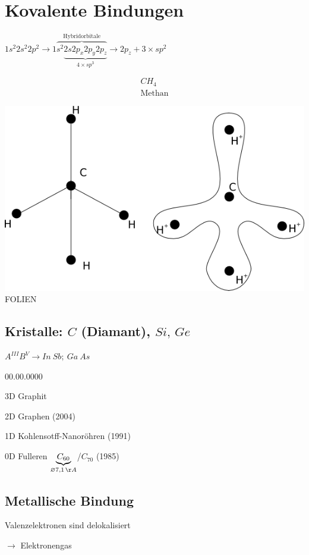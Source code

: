 \nr
\section{Kovalente Bindungen}

$1s^{2}2s^{2}2p^{2}\to1\overbrace{s^{2}\underbrace{2s2p_{x}2p_{y}2p_{z}}_{4\times sp^{3}}}^{\text{Hybridorbitale}}\to2p_{z}+3\times sp^{2}$

\begin{eqnarray*}
CH_{4}\\
\text{Methan}\end{eqnarray*}

\includegraphics[scale=.5]{images/2009-10-27-hybridspiegelung.png}
FOLIEN
\subsection{Kristalle: $C$ (Diamant), $Si,\, Ge$}

$A^{III}B^{V}\to In\ Sb;\ Ga\ As$
\begin{labeling}{00.00.0000}
\item [{3D}] Graphit
\item [{2D}] Graphen (2004)
\item [{1D}] Kohlensotff-Nanoröhren (1991) 
\item [{0D}] Fulleren $\underbrace{C_{60}}_{\varnothing7,1\,\AA}$/$C_{70}$
(1985)
\end{labeling}

\subsection{Metallische Bindung}

Valenzelektronen sind delokalisiert

$\to$ Elektronengas

